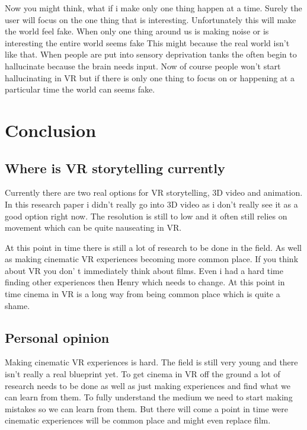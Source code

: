 \documentclass{report}
\begin{document}
				Now you might think, what if i make only one thing happen at a time. Surely the user will focus on the one thing that is interesting. Unfortunately this will make the world feel fake. When only one thing around us is making noise or is interesting the entire world seems fake This might because the real world isn't like that. When people are put into sensory deprivation tanks the often begin to hallucinate because the brain needs input. Now of course people won't start hallucinating in VR but if there is only one thing to focus on or happening at a particular time the world can seems fake. 
				
								
				\chapter{Conclusion}
				\section{Where is VR storytelling currently}
				
				Currently there are two real options for VR storytelling, 3D video and animation. In this research paper i didn't really go into 3D video as i don't really see it as a good option right now. The resolution is still to low and it often still relies on movement which can be quite nauseating in VR. 
				
				At this point in time there is still a lot of research to be done in the field. As well as making cinematic VR experiences becoming more common place. If you think about VR you don' t immediately think about films. Even i had a hard time finding other experiences then Henry which needs to change. At this point in time cinema in VR is a long way from being common place which is quite a shame.
				
				
				
				\section{Personal opinion}
				
				Making cinematic VR experiences is hard. The field is still very young and there isn't really a real blueprint yet. To get cinema in VR off the ground a lot of research needs to be done as well as just making experiences and find what we can learn from them. To fully understand the medium we need to start making mistakes so we can learn from them.
				But there will come a point in time were cinematic experiences will be common place and might even replace film.
\end{document}
